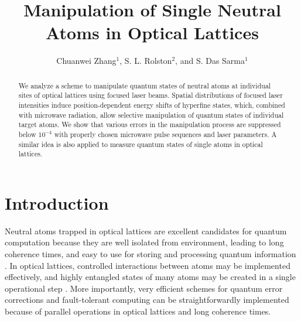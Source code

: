 \documentclass[pra,aps,showpacs,twocolumn]{revtex4}
\begin{document}
\title{Manipulation of Single Neutral Atoms in Optical Lattices}
\author{Chuanwei Zhang$^{1}$, S. L. Rolston$^{2}$, and S. Das Sarma$^{1}$}

\begin{abstract}
We analyze a scheme to manipulate quantum states of neutral atoms at
individual sites of optical lattices using focused laser beams. Spatial
distributions of focused laser intensities induce position-dependent energy
shifts of hyperfine states, which, combined with microwave radiation, allow
selective manipulation of quantum states of individual target atoms. We show
that various errors in the manipulation process are suppressed below $%
10^{-4} $ with properly chosen microwave pulse sequences and laser
parameters. A similar idea is also applied to measure quantum states of
single atoms in optical lattices.
\end{abstract}

\maketitle

\section{Introduction}

Neutral atoms trapped in optical lattices are excellent candidates for
quantum computation because they are well isolated from environment, leading
to long coherence times, and easy to use for storing and processing quantum
information \cite{Nielsen,zoller1}. In optical lattices, controlled
interactions between atoms may be implemented effectively, and highly
entangled states of many atoms may be created in a single operational step 
\cite{Jaksch, Mandel1,Duan}. More importantly, very efficient schemes for
quantum error corrections \cite{Steane} and fault-tolerant computing \cite%
{Shor} can be straightforwardly implemented because of parallel operations
in optical lattices \cite{Briegel} and long coherence times.
\end{document}
